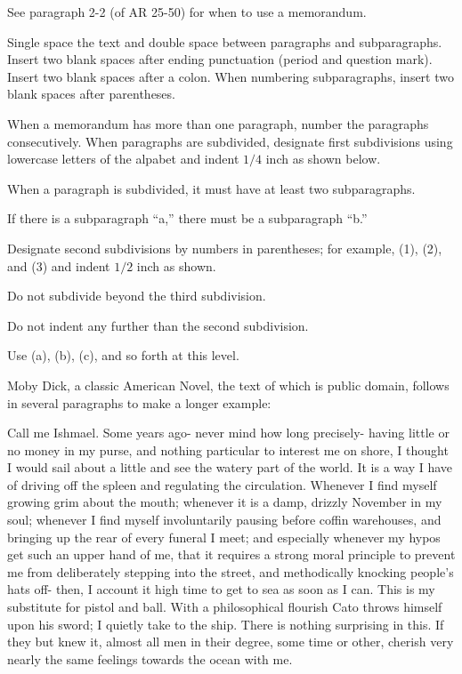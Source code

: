 \documentclass{armymemo}
\begin{document}
\AMdate{\today}
\AMsethead

\Ni See paragraph 2-2 (of AR 25-50) for when to use a memorandum.

\Ni Single space the text and double space between paragraphs and
subparagraphs. Insert two blank spaces after ending punctuation (period and
question mark). %
Insert two blank spaces after a colon. When numbering subparagraphs, insert two
blank spaces after parentheses.

\Ni When a memorandum has more than one paragraph, number the paragraphs
consecutively. When paragraphs are subdivided, designate first subdivisions
using lowercase letters of the alpabet and indent $1/4$ inch as shown below.

\Nii When a paragraph is subdivided, it must have at least two subparagraphs.

\Nii If there is a subparagraph ``a,'' there must be a subparagraph ``b.''

\Niii Designate second subdivisions by numbers in parentheses; for example, (1),
(2), and (3) and indent $1/2$ inch as shown.

\Niii Do not subdivide beyond the third subdivision.

\Niiii Do not indent any further than the second subdivision.

\Niiii Use (a), (b), (c), and so forth at this level.

\Ni Moby Dick, a classic American Novel, the text of which is public domain,
follows in several paragraphs to make a longer example:

\Nii Call me Ishmael. Some years ago- never mind how long precisely- having little or
no money in my purse, and nothing particular to interest me on shore, I thought
I would sail about a little and see the watery part of the world. It is a way I
have of driving off the spleen and regulating the circulation. Whenever I find
myself growing grim about the mouth; whenever it is a damp, drizzly November in
my soul; whenever I find myself involuntarily pausing before coffin warehouses,
and bringing up the rear of every funeral I meet; and especially whenever my
hypos get such an upper hand of me, that it requires a strong moral principle to
prevent me from deliberately stepping into the street, and methodically knocking
people's hats off- then, I account it high time to get to sea as soon as I can.
This is my substitute for pistol and ball. With a philosophical flourish Cato
throws himself upon his sword; I quietly take to the ship. There is nothing
surprising in this. If they but knew it, almost all men in their degree, some
time or other, cherish very nearly the same feelings towards the ocean with me.
\end{document}
